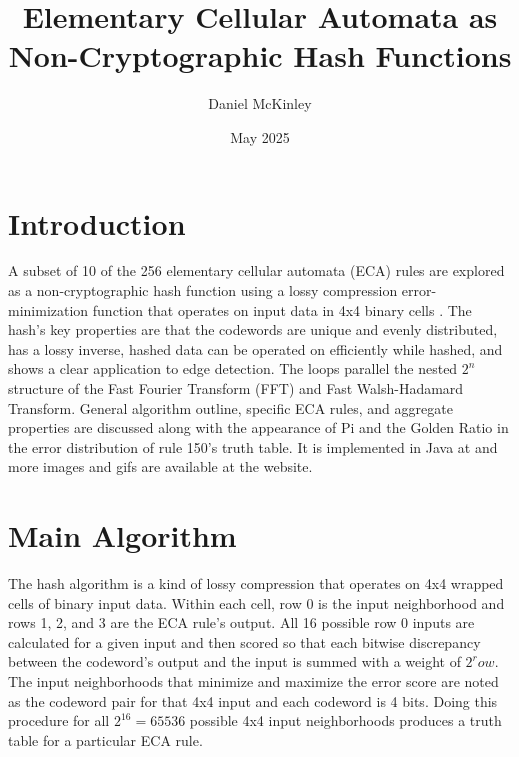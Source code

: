 \documentclass[11pt]{article}
\title{Elementary Cellular Automata as Non-Cryptographic Hash Functions}
\date{May 2025}
\author{Daniel McKinley}
\begin{document}
\maketitle

\section{Introduction}

A subset of 10 of the 256 elementary cellular automata (ECA) rules are explored as a non-cryptographic hash function using a lossy compression error-minimization function that operates on input data in 4x4 binary cells \cite{Wolfram}. The hash's key properties are that the codewords are unique and evenly distributed, has a lossy inverse, hashed data can be operated on efficiently while hashed, and shows a clear application to edge detection.  The loops parallel the nested $2^n$ structure of the Fast Fourier Transform (FFT) and Fast Walsh-Hadamard Transform. General algorithm outline, specific ECA rules, and aggregate properties are discussed along with the appearance of Pi and the Golden Ratio in the error distribution of rule 150's truth table. It is implemented in Java at \cite{mygit} and more images and gifs are available at the website.\\

\section{Main Algorithm}

The hash algorithm is a kind of lossy compression that operates on 4x4 wrapped cells of binary input data. Within each cell, row 0 is the input neighborhood and rows 1, 2, and 3 are the ECA rule's output. All 16 possible row 0 inputs are calculated for a given input and then scored so that each bitwise discrepancy between the codeword's output and the input is summed with a weight of $2^row$. The input neighborhoods that minimize and maximize the error score are noted as the codeword pair for that 4x4 input and each codeword is 4 bits. Doing this procedure for all  $2^{16}=65536$ possible 4x4 input neighborhoods produces a truth table for a particular ECA rule.\\
\end{document}
